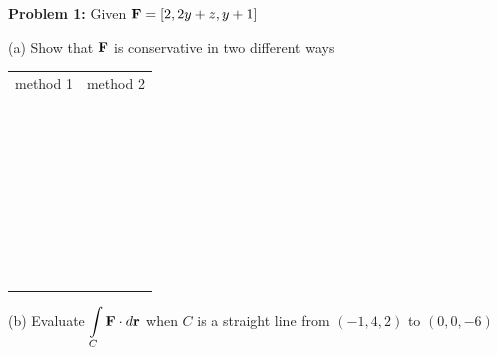 \documentclass[12pt]{amsart}
\numberwithin{equation}{section}
\begin{document}
\vspace{1.0cm}

\thispagestyle{empty}
\newpage
\thispagestyle{empty}

{\bf Problem 1:} Given $\text{\bf F} = [2,2y+z,y+1]$

(a) Show that $\text{\bf F}$ is conservative in two different ways

	\begin{tabular}{p{10cm}|p{10cm}}
		\multicolumn{1}{c|}{method 1}&\multicolumn{1}{c}{method 2}\\
		&\\&\\&\\&\\&\\&\\&\\&\\&\\&\\&\\&\\&\\&\\&\\&\\&\\&\\&\\&\\&\\&\\&\\&\\&\\&\\&\\&\\&\\&\\&\\&\\&\\&\\&\\&\\&\\
	\end{tabular}

\vspace{0.4cm}

(b) Evaluate $\displaystyle{\int \limits_{C} \text{\bf F} \cdot  d\text{\bf r}}$ when $C$ is a straight line from $(-1,4,2)$ to $(0,0,-6)$

\thispagestyle{empty}
\newpage
\thispagestyle{empty}
\end{document}
